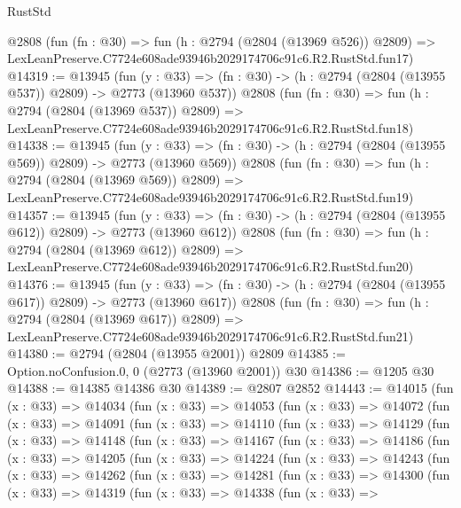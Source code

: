 \begin{lexlean}{RustStd}
\begin{coremodule}
    @2808
    (fun (fn : @30) =>
    fun (h : @2794 (@2804 (@13969 @526)) @2809) =>
    LexLeanPreserve.C7724e608ade93946b2029174706c91c6.R2.RustStd.fun17)
@14319 := @13945
    (fun (y : @33) => (fn : @30) -> (h : @2794 (@2804 (@13955 @537)) @2809) -> @2773 (@13960 @537))
    @2808
    (fun (fn : @30) =>
    fun (h : @2794 (@2804 (@13969 @537)) @2809) =>
    LexLeanPreserve.C7724e608ade93946b2029174706c91c6.R2.RustStd.fun18)
@14338 := @13945
    (fun (y : @33) => (fn : @30) -> (h : @2794 (@2804 (@13955 @569)) @2809) -> @2773 (@13960 @569))
    @2808
    (fun (fn : @30) =>
    fun (h : @2794 (@2804 (@13969 @569)) @2809) =>
    LexLeanPreserve.C7724e608ade93946b2029174706c91c6.R2.RustStd.fun19)
@14357 := @13945
    (fun (y : @33) => (fn : @30) -> (h : @2794 (@2804 (@13955 @612)) @2809) -> @2773 (@13960 @612))
    @2808
    (fun (fn : @30) =>
    fun (h : @2794 (@2804 (@13969 @612)) @2809) =>
    LexLeanPreserve.C7724e608ade93946b2029174706c91c6.R2.RustStd.fun20)
@14376 := @13945
    (fun (y : @33) => (fn : @30) -> (h : @2794 (@2804 (@13955 @617)) @2809) -> @2773 (@13960 @617))
    @2808
    (fun (fn : @30) =>
    fun (h : @2794 (@2804 (@13969 @617)) @2809) =>
    LexLeanPreserve.C7724e608ade93946b2029174706c91c6.R2.RustStd.fun21)
@14380 := @2794 (@2804 (@13955 @2001)) @2809
@14385 := Option.noConfusion.{0, 0} (@2773 (@13960 @2001)) @30
@14386 := @1205 @30
@14388 := @14385 @14386 @30
@14389 := @2807 @2852
@14443 := @14015
    (fun (x : @33) =>
    @14034
      (fun (x : @33) =>
      @14053
        (fun (x : @33) =>
        @14072
          (fun (x : @33) =>
          @14091
            (fun (x : @33) =>
            @14110
              (fun (x : @33) =>
              @14129
                (fun (x : @33) =>
                @14148
                  (fun (x : @33) =>
                  @14167
                    (fun (x : @33) =>
                    @14186
                      (fun (x : @33) =>
                      @14205
                        (fun (x : @33) =>
                        @14224
                          (fun (x : @33) =>
                          @14243
                            (fun (x : @33) =>
                            @14262
                              (fun (x : @33) =>
                              @14281
                                (fun (x : @33) =>
                                @14300
                                  (fun (x : @33) =>
                                  @14319
                                    (fun (x : @33) =>
                                    @14338
                                      (fun (x : @33) =>

\end{coremodule}
\end{lexlean}
